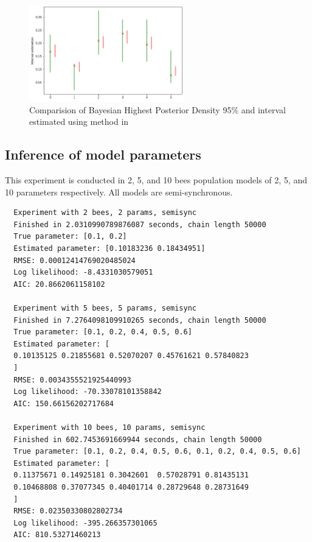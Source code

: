 \documentclass[12pt]{article}
\theoremstyle{definition}
\begin{document}
\begin{figure}[H]
  \centering
  \includegraphics[width=0.6\textwidth,keepaspectratio]{figures/interval_estimation.png}
  \caption{Comparision of Bayesian Highest Posterior Density 95\% and interval
    estimated using method in \cite{hajnal2019data}}
\end{figure}


\subsection{Inference of model parameters}
This experiment is conducted in 2, 5, and 10 bees population models of 2, 5, and 10
parameters respectively. All models are semi-synchronous.\\
\begin{lstlisting}
  Experiment with 2 bees, 2 params, semisync
  Finished in 2.0310990789876087 seconds, chain length 50000
  True parameter: [0.1, 0.2]
  Estimated parameter: [0.10183236 0.18434951]
  RMSE: 0.00012414769020485024
  Log likelihood: -8.4331030579051
  AIC: 20.8662061158102

  Experiment with 5 bees, 5 params, semisync
  Finished in 7.2764098109910265 seconds, chain length 50000
  True parameter: [0.1, 0.2, 0.4, 0.5, 0.6]
  Estimated parameter: [
  0.10135125 0.21855681 0.52070207 0.45761621 0.57840823
  ]
  RMSE: 0.0034355521925440993
  Log likelihood: -70.33078101358842
  AIC: 150.66156202717684

  Experiment with 10 bees, 10 params, semisync
  Finished in 602.7453691669944 seconds, chain length 50000
  True parameter: [0.1, 0.2, 0.4, 0.5, 0.6, 0.1, 0.2, 0.4, 0.5, 0.6]
  Estimated parameter: [
  0.11375671 0.14925181 0.3042601  0.57028791 0.81435131
  0.10468808 0.37077345 0.40401714 0.28729648 0.28731649
  ]
  RMSE: 0.02350330802802734
  Log likelihood: -395.266357301065
  AIC: 810.53271460213

\end{lstlisting}
\end{document}
